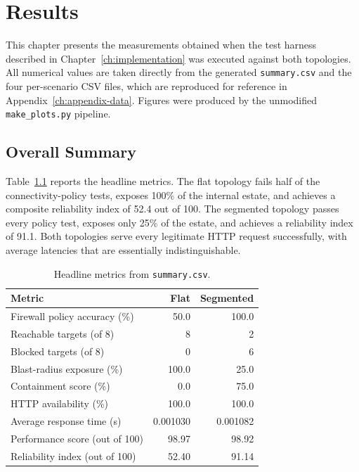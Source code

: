 \chapter{Results}
\label{ch:results}

This chapter presents the measurements obtained when the test harness described in Chapter~\ref{ch:implementation} was executed against both topologies. All numerical values are taken directly from the generated \texttt{summary.csv} and the four per-scenario CSV files, which are reproduced for reference in Appendix~\ref{ch:appendix-data}. Figures were produced by the unmodified \texttt{make\_plots.py} pipeline.

\section{Overall Summary}

Table~\ref{tab:summary} reports the headline metrics. The flat topology fails half of the connectivity-policy tests, exposes 100\% of the internal estate, and achieves a composite reliability index of 52.4 out of 100. The segmented topology passes every policy test, exposes only 25\% of the estate, and achieves a reliability index of 91.1. Both topologies serve every legitimate HTTP request successfully, with average latencies that are essentially indistinguishable.

\begin{table}[H]
\centering
\caption[Headline metrics]{Headline metrics from \texttt{summary.csv}.}
\label{tab:summary}
\begin{tabularx}{\textwidth}{X r r}
\toprule
\textbf{Metric} & \textbf{Flat} & \textbf{Segmented} \\
\midrule
Firewall policy accuracy (\%) & 50.0 & 100.0 \\
Reachable targets (of 8) & 8 & 2 \\
Blocked targets (of 8) & 0 & 6 \\
Blast-radius exposure (\%) & 100.0 & 25.0 \\
Containment score (\%) & 0.0 & 75.0 \\
HTTP availability (\%) & 100.0 & 100.0 \\
Average response time (s) & 0.001030 & 0.001082 \\
Performance score (out of 100) & 98.97 & 98.92 \\
Reliability index (out of 100) & 52.40 & 91.14 \\
\bottomrule
\end{tabularx}
\end{table}

